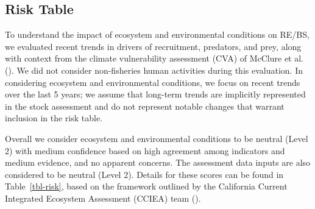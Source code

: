 \documentclass[
]{scrartcl}
\begin{document}
\subsection*{Risk Table}\label{risk-table}

To understand the impact of ecosystem and environmental conditions on
RE/BS, we evaluated recent trends in drivers of recruitment, predators,
and prey, along with context from the climate vulnerability assessment
(CVA) of McClure et al. (). We did not
consider non-fisheries human activities during this evaluation. In
considering ecosystem and environmental conditions, we focus on recent
trends over the last 5 years; we assume that long-term trends are
implicitly represented in the stock assessment and do not represent
notable changes that warrant inclusion in the risk table.

Overall we consider ecosystem and environmental conditions to be neutral
(Level 2) with medium confidence based on high agreement among
indicators and medium evidence, and no apparent concerns. The assessment
data inputs are also considered to be neutral (Level 2). Details for
these scores can be found in Table~\ref{tbl-risk}, based on the
framework outlined by the California Current Integrated Ecosystem
Assessment (CCIEA) team ().

\newpage

\begingroup
\fontsize{9.0pt}{10.8pt}\selectfont
\end{document}
